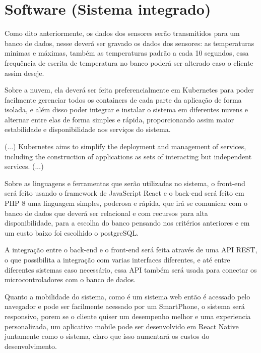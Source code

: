 \section{Software (Sistema integrado)}

    Como dito anteriormente, os dados 
    dos sensores serão transmitidos para um banco de dados,
    nesse deverá ser gravado os dados dos sensores:
    as temperaturas minimas e máximas, também as temperaturas 
    padrão a cada 10 segundos, essa frequência de 
    escrita de temperatura no banco poderá ser alterado caso o 
    cliente assim deseje.

    Sobre a nuvem, ela deverá ser feita preferencialmente 
    em Kubernetes para poder facilmente gerenciar todos os containers 
    de cada parte da aplicação de forma isolada, e além disso 
    poder integrar e instalar o sistema em diferentes nuvens
    e alternar entre elas de forma simples e rápida, 
    proporcionando assim maior estabilidade e disponibilidade
    aos serviços do sistema.

    \begin{citacao}[english]
        (...)
        Kubernetes aims to simplify the deployment and management 
        of services, including the construction of applications 
        as sets of interacting but independent services.
        (...)
        \cite{brewer2015kubernetes}
    \end{citacao}

    Sobre as linguagens e ferramentas que serão utilizadas
    no sistema, o front-end será feito usando o framework 
    de JavaScript React e o back-end será feito em PHP 8
    uma linguagem simples, poderosa e rápida, que irá se comunicar
    com o banco de dados que deverá ser relacional e com recursos
    para alta disponibilidade, para a escolha do banco pensando nos
    critérios anteriores e em um custo baixo foi escolhido o 
    postgreSQL.

    A integração entre o back-end e o front-end será feita 
    através de uma API REST, o que possibilita a integração 
    com varias interfaces diferentes, e até entre diferentes
    sistemas caso necessário, essa API também será usada 
    para conectar os microcontroladores com o banco de dados.

    Quanto a mobilidade do sistema, como é um sistema web
    então é acessado pelo navegador e pode ser facilmente
    acessado por um SmartPhone, o sistema será responsivo, 
    porem se o cliente quiser um desempenho melhor e 
    uma experiencia personalizada, um aplicativo 
    mobile pode ser desenvolvido em React Native 
    juntamente como o sistema, claro que isso aumentará 
    os custos do desenvolvimento.

